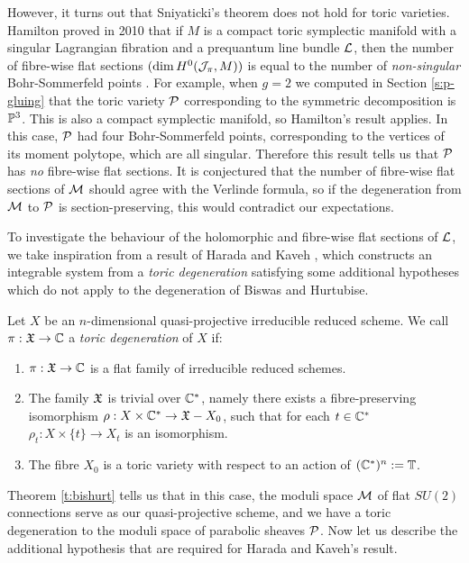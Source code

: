 	However, it turns out that Sniyaticki's theorem does not hold for toric varieties. Hamilton proved in 2010 that if $M$ is a compact toric symplectic manifold with a singular Lagrangian fibration and a prequantum line bundle $\mathcal{L}$, then the number of fibre-wise flat sections $(\dim H^0(\mathcal{J}_{\pi}, M))$ is equal to the number of \emph{non-singular} Bohr-Sommerfeld points \cite[Theorem 8.3.2]{hamilton_locally_2010}. For example, when $g=2$ we computed in Section \ref{s:p-gluing} that the toric variety $\mathcal{P}$ corresponding to the symmetric decomposition is $\mathbb{P}^3$. This is also a compact symplectic manifold, so Hamilton's result applies. In this case, $\mathcal{P}$ had four Bohr-Sommerfeld points, corresponding to the vertices of its moment polytope, which are all singular. Therefore this result tells us that $\mathcal{P}$ has \emph{no} fibre-wise flat sections. It is conjectured that the number of fibre-wise flat sections of $\mathcal{M}$ should agree with the Verlinde formula, so if the degeneration from $\mathcal{M}$ to $\mathcal{P}$ is section-preserving, this would contradict our expectations.
	
	To investigate the behaviour of the holomorphic and fibre-wise flat sections of $\mathcal{L}$, we take inspiration from a result of Harada and Kaveh \cite{harada_integrable_2015}, which constructs an integrable system from a \textit{toric degeneration} satisfying some additional hypotheses which do not apply to the degeneration of Biswas and Hurtubise. 
	\begin{definition}
		\label{d:toricdegen}
		Let $X$ be an $n$-dimensional quasi-projective irreducible reduced scheme. We call $\pi: \mathfrak{X}\to\mathbb{C}$ a \emph{toric degeneration} of $X$ if:
		\begin{enumerate}
			\item $\pi:\mathfrak{X}\to\mathbb{C}$ is a flat family of irreducible reduced schemes.
			\item The family $\mathfrak{X}$ is trivial over $\mathbb{C}^\ast$, namely there exists a fibre-preserving isomorphism $\rho:X\times\mathbb{C}^\ast \to \mathfrak{X} - X_0$, such that for each $t\in \mathbb{C}^\ast$ $\rho_t:X\times\{t\} \to X_t$ is an isomorphism.
			\item The fibre $X_0$ is a toric variety with respect to an action of $(\mathbb{C}^\ast)^n := \mathbb{T}$.
		\end{enumerate}
	\end{definition}
	Theorem \ref{t:bishurt} tells us that in this case, the moduli space $\mathcal{M}$ of flat $SU(2)$ connections serve as our quasi-projective scheme, and we have a toric degeneration to the moduli space of parabolic sheaves $\mathcal{P}$. Now let us describe the additional hypothesis that are required for Harada and Kaveh's result.
	
